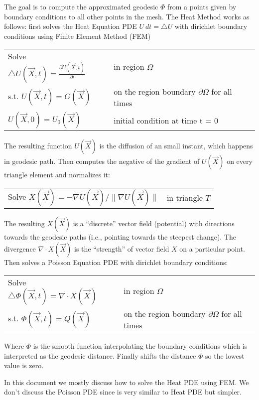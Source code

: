 \documentclass{birkjour}
\numberwithin{equation}{section}
\begin{document}
The goal is to compute the approximated geodesic $\Phi$ from a points given by boundary conditions
to all other points in the mesh. The Heat Method works as follows: first solves the Heat Equation 
PDE $U \ dt = \bigtriangleup U$ with dirichlet boundary conditions using Finite Element Method (FEM)

\begin{tabular}{l l}
	Solve $\bigtriangleup U(\vec X, t) = \frac{ \partial U(\vec X, t)}{\partial t}$ & in region $\Omega$ \\
	s.t. $U(\vec X, t) = G(\vec X)$  &  on the region boundary $\partial \Omega$ for all times \\
	$U(\vec X, 0) = U_0(\vec X)$  &  initial condition at time t = 0 \\
\end{tabular}

The resulting function $U(\vec X)$ is the diffusion of an small instant, which happens in geodesic path.
Then computes the negative of the gradient of $U(\vec X)$ on every triangle element and normalizes it:

\begin{tabular}{l l}
	Solve $X(\vec X) = - \nabla U(\vec X) / \|\nabla U(\vec X)\|$ & in triangle $T$ \\
\end{tabular}

The resulting $X(\vec X)$ is a ``discrete'' vector field (potential) with directions towards the geodesic 
paths (i.e., pointing towards the steepest change). The divergence $\nabla \cdot X(\vec X)$
is the ``strength'' of vector field $X$ on a particular point. Then solves a Poisson Equation PDE with 
dirichlet boundary conditions:

\begin{tabular}{l l}
	Solve $\bigtriangleup \Phi(\vec X, t) = \nabla \cdot X(\vec X)$ & in region $\Omega$ \\
	s.t. $\Phi(\vec X, t) = Q(\vec X)$  &  on the region boundary $\partial \Omega$ for all times \\
\end{tabular}

Where $\Phi$ is the smooth function interpolating the boundary conditions which is interpreted as
the geodesic distance. Finally shifts the distance $\Phi$ so the lowest value is zero.

In this document we mostly discuss how to solve the Heat PDE using FEM. We don't discuss the Poisson PDE since is 
very similar to Heat PDE but simpler.
\end{document}

